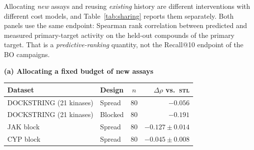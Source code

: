 \documentclass[10pt]{article}
\newcommand{\stl}{\textsc{stl}}
\begin{document}
Allocating \emph{new} assays and reusing \emph{existing} history are
different interventions with different cost models, and Table~\ref{tab:sharing}
reports them separately. Both panels use the same endpoint: Spearman rank
correlation between predicted and measured primary-target activity on the
held-out compounds of the primary target. That is a \emph{predictive-ranking}
quantity, not the Recall@10 endpoint of the BO campaigns.

\begin{table}[htbp]
\centering\small
\textbf{(a) Allocating a fixed budget of new assays}\\[3pt]
\begin{tabular}{llcr}
\toprule
Dataset & Design & $n$ & $\Delta\rho$ vs.\ \stl{} \\
\midrule
DOCKSTRING (21 kinases) & Spread  & 80 & $-0.056$ \\
DOCKSTRING (21 kinases) & Blocked & 80 & $-0.191$ \\ %
JAK block & Spread & 80 & $-0.127\pm0.014$ \\ %
CYP block & Spread & 80 & $-0.045\pm0.008$ \\ %
\bottomrule
\end{tabular}


\end{table}
\end{document}
